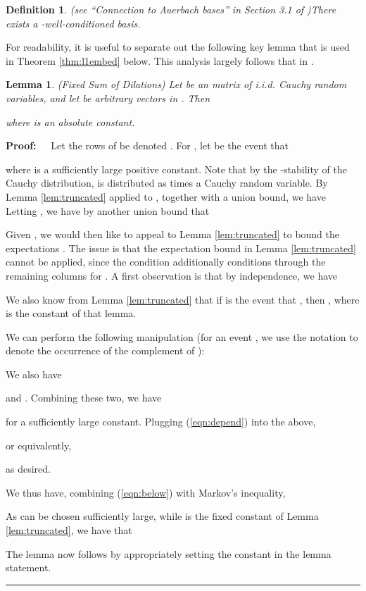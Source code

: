 \documentclass[11pt]{article}
\newtheorem{lemma}[theorem]{Lemma}
\newtheorem{definition}[theorem]{Definition}
\newenvironment{proof}{\begin{trivlist} \item {\bf Proof:~~}}
  {\qed\end{trivlist}}
\def\qed{\hfill\rule{2mm}{2mm}}
\begin{document}
\begin{definition}(see ``Connection to Auerbach bases'' in Section 3.1 of \cite{DDHKM09})\label{thm:auerbach}
There exists a -well-conditioned basis. 
\end{definition}

For readability, it is useful to separate out the following key lemma that is used in Theorem \ref{thm:l1embed} below.
This analysis largely follows that in \cite{sw11}. 
\begin{lemma}\label{lem:key}(Fixed Sum of Dilations)
Let  be an  matrix of i.i.d. Cauchy random variables, and let  be  arbitrary vectors
in . Then 

where  is an absolute constant. 
\end{lemma}
\begin{proof}
Let the rows of  be denoted . 
For , let  be the event that 

where  is a sufficiently large positive constant. Note that by the -stability of the Cauchy distribution,
 is distributed as  times a Cauchy random variable. 
By Lemma \ref{lem:truncated} applied to , together with a union bound, we
have 
Letting , we have by another union bound that


Given , we would then like to appeal
to Lemma \ref{lem:truncated} to bound the expectations . 
The issue
is that the expectation bound in Lemma \ref{lem:truncated} cannot be applied, since the condition
 additionally conditions  through the remaining columns  
for . A first observation
is that by independence, we have

We also know from Lemma \ref{lem:truncated} that if  is the event that
, then 
, where  is the constant
of that lemma.

We can perform the following manipulation (for an event , we use the notation
 to denote the occurrence of the complement of ):

We also have 

and . Combining these two, we have

for  a sufficiently large constant. Plugging (\ref{eqn:depend}) into the above,

or equivalently, 

as desired. 

We thus have, combining (\ref{eqn:below}) with Markov's inequality,

As  can be chosen sufficiently large, while  is the fixed constant of Lemma \ref{lem:truncated},
we have that

The lemma now follows by appropriately setting the constant  in the lemma statement. 
\end{proof}
\end{document}
